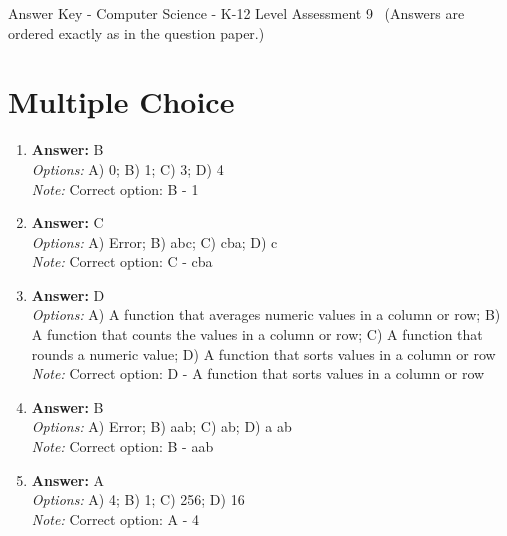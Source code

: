 \documentclass[12pt]{article}
\begin{document}
\begin{center}
Answer Key - Computer Science - K-12 Level Assessment 9 \
\small (Answers are ordered exactly as in the question paper.)
\end{center}

\section*{Multiple Choice}
\begin{enumerate}[label=\arabic*.]
\item \textbf{Answer:} B
\\ \textit{Options:} A) 0; B) 1; C) 3; D) 4
\\ \textit{Note:} Correct option: B - 1
\item \textbf{Answer:} C
\\ \textit{Options:} A) Error; B) abc; C) cba; D) c
\\ \textit{Note:} Correct option: C - cba
\item \textbf{Answer:} D
\\ \textit{Options:} A) A function that averages numeric values in a column or row; B) A function that counts the values in a column or row; C) A function that rounds a numeric value; D) A function that sorts values in a column or row
\\ \textit{Note:} Correct option: D - A function that sorts values in a column or row
\item \textbf{Answer:} B
\\ \textit{Options:} A) Error; B) aab; C) ab; D) a ab
\\ \textit{Note:} Correct option: B - aab
\item \textbf{Answer:} A
\\ \textit{Options:} A) 4; B) 1; C) 256; D) 16
\\ \textit{Note:} Correct option: A - 4
\end{enumerate}
\end{document}
